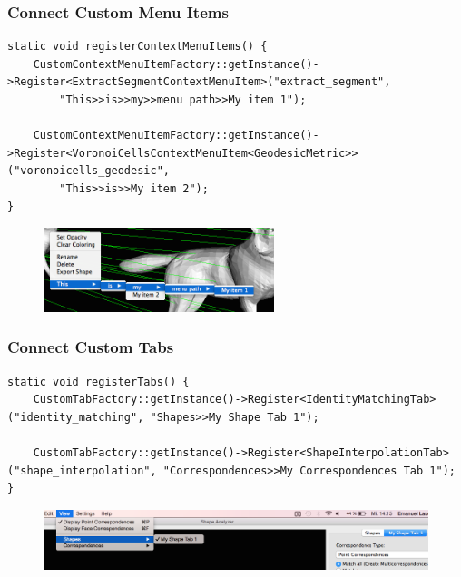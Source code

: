 \documentclass[compress]{beamer}
\begin{document}
\begin{frame}[fragile]
\frametitle{Connect Custom Menu Items}
\begin{lstlisting}
static void registerContextMenuItems() {
    CustomContextMenuItemFactory::getInstance()->Register<ExtractSegmentContextMenuItem>("extract_segment",
        "This>>is>>my>>menu path>>My item 1");
   
    CustomContextMenuItemFactory::getInstance()->Register<VoronoiCellsContextMenuItem<GeodesicMetric>>("voronoicells_geodesic",
        "This>>is>>My item 2");
}     
\end{lstlisting}
  \begin{figure}[h]
	\centering
	\includegraphics[width=0.60\textwidth]{menu.png}
\end{figure}
\end{frame}

\begin{frame}[fragile]
\frametitle{Connect Custom Tabs}
\begin{lstlisting}
static void registerTabs() {
    CustomTabFactory::getInstance()->Register<IdentityMatchingTab>("identity_matching", "Shapes>>My Shape Tab 1");

    CustomTabFactory::getInstance()->Register<ShapeInterpolationTab>("shape_interpolation", "Correspondences>>My Correspondences Tab 1");
}
\end{lstlisting}
  \begin{figure}[h]
	\centering
	\includegraphics[width=\textwidth]{tabs.png}
\end{figure}
\end{frame}
\end{document}
